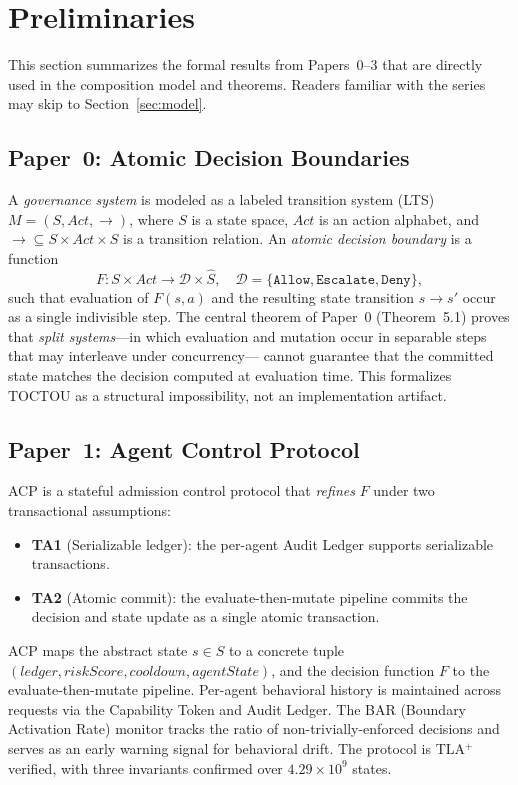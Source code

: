 \documentclass[11pt]{article}
\newcommand{\Dec}{\mathcal{D}}
\newcommand{\allow}{\texttt{Allow}}
\newcommand{\deny}{\texttt{Deny}}
\newcommand{\escalate}{\texttt{Escalate}}
\begin{document}
\section{Preliminaries}
\label{sec:prelim}

This section summarizes the formal results from Papers~0--3 that are
directly used in the composition model and theorems. Readers familiar with
the series may skip to Section~\ref{sec:model}.

\subsection{Paper~0: Atomic Decision Boundaries~\cite{fernandez2026a}}

A \emph{governance system} is modeled as a labeled transition system (LTS)
$M = (S, \mathit{Act}, \to)$, where $S$ is a state space, $\mathit{Act}$ is
an action alphabet, and ${\to} \subseteq S \times \mathit{Act} \times S$ is
a transition relation. An \emph{atomic decision boundary} is a function
\[
  F: S \times \mathit{Act} \to \Dec \times \hat{S}, \quad
  \Dec = \{\allow, \escalate, \deny\},
\]
such that evaluation of $F(s, a)$ and the resulting state transition
$s \to s'$ occur as a single indivisible step. The central theorem of
Paper~0 (Theorem~5.1) proves that \emph{split systems}---in which evaluation
and mutation occur in separable steps that may interleave under concurrency---
cannot guarantee that the committed state matches the decision computed at
evaluation time. This formalizes TOCTOU as a structural impossibility, not
an implementation artifact.

\subsection{Paper~1: Agent Control Protocol~\cite{fernandez2026b}}

ACP is a stateful admission control protocol that \emph{refines} $F$ under
two transactional assumptions:
\begin{itemize}[noitemsep]
  \item \textbf{TA1} (Serializable ledger): the per-agent Audit Ledger
    supports serializable transactions.
  \item \textbf{TA2} (Atomic commit): the evaluate-then-mutate pipeline
    commits the decision and state update as a single atomic transaction.
\end{itemize}
{\sloppy
ACP maps the abstract state $s \in S$ to a concrete tuple
$(ledger, riskScore, cooldown, agentState)$, and the decision function $F$ to
the evaluate-then-mutate pipeline. Per-agent behavioral history is maintained
across requests via the Capability Token and Audit Ledger. The BAR (Boundary
Activation Rate) monitor tracks the ratio of non-trivially-enforced decisions
and serves as an early warning signal for behavioral drift. The protocol is
TLA$^+$ verified, with three invariants confirmed over $4.29 \times 10^9$ states.
\par}
\end{document}
